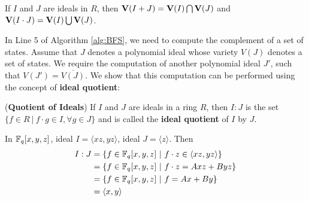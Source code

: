 \begin{Theorem}
\label{thm:unionintersect}
If $I$ and $J$ are ideals in $R$, then 
${\bf V}(I + J) = {\bf V}(I) \bigcap {\bf V}(J)$ and ${\bf V}(I \cdot
J) = {\bf V}(I) \bigcup {\bf V}(J)$. 
\end{Theorem}


In Line 5 of Algorithm  \ref{alg:BFS}, we need to compute the complement of a
set of states. Assume that $J$ denotes a polynomial ideal whose
variety $V(J)$ denotes a set of states. We require the computation of
another polynomial ideal $J'$, such that $V(J')=\overline{V(J)}$. We
show that this computation can be performed using the concept of {\bf
  ideal quotient}:  

\begin{Definition}
\label{def:quo}
({\bf Quotient of Ideals}) If $I$ and $J$ are ideals in a ring $R$, then $I:J$ is the set
  $\{f \in R \ |\ f\cdot g \in I, \forall g \in J\}$ %
and is called the {\bf ideal quotient} of $I$ by $J$.
\end{Definition}

\begin{Example}
In ${\mathbb{F}}_{q}[x,y,z]$, ideal $I = \langle xz,yz\rangle$, ideal $J = \langle z\rangle$. Then
\begin{align*}
I:J &= \{f\in{\mathbb{F}}_{q}[x,y,z]~|~f\cdot z \in \langle xz,yz\rangle\} \\
&= \{f\in{\mathbb{F}}_{q}[x,y,z]~|~f\cdot z = Axz+Byz\}\\
&= \{f\in{\mathbb{F}}_{q}[x,y,z]~|~f= Ax+By\}\\
&= \langle x,y\rangle
\end{align*}
\end{Example}



